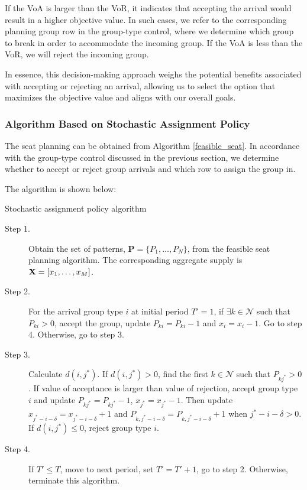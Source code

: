 If the VoA is larger than the VoR, it indicates that accepting the arrival would result in a higher objective value. In such cases, we refer to the corresponding planning group row in the group-type control, where we determine which group to break in order to accommodate the incoming group. If the VoA is less than the VoR, we will reject the incoming group.

In essence, this decision-making approach weighs the potential benefits associated with accepting or rejecting an arrival, allowing us to select the option that maximizes the objective value and aligns with our overall goals.


\subsubsection{Algorithm Based on Stochastic Assignment Policy}
The seat planning can be obtained from Algorithm \ref{feasible_seat}. In accordance with the group-type control discussed in the previous section, we determine whether to accept or reject group arrivals and which row to assign the group in.

The algorithm is shown below:

\begin{algorithm}[H]
  \caption{Stochastic assignment policy algorithm}\label{algo_dynamic_policy}
  \begin{description}
    \item[Step 1.] Obtain the set of patterns, $\mathbf{P} = \{P_1,\ldots,P_{N}\}$, from the feasible seat planning algorithm. The corresponding aggregate supply is $\mathbf{X} = [x_{1}, \ldots, x_{M}]$.
    \item[Step 2.] For the arrival group type $i$ at initial period $T{'} =1$, if $\exists k \in \mathcal{N}$ such that $P_{ki} > 0$, accept the group, update $P_{ki} = P_{ki} -1$ and $x_{i} = x_{i} -1$. Go to step 4. Otherwise, go to step 3.
    \item[Step 3.] Calculate $d(i,j^{*})$. If $d(i,j^{*})>0$, find the first $k \in \mathcal{N}$ such that $P_{k j^{*}} >0$. If value of acceptance is larger than value of rejection, accept group type $i$ and update $P_{k j^{*}} = P_{k j^{*}}-1$, $x_{j^{*}} = x_{j^{*}} -1$. Then update $x_{j^{*}-i-\delta} = x_{j^{*}-i-\delta} + 1$ and $P_{k, j^{*}-i-\delta} = P_{k, j^{*}-i-\delta} +1$ when $j^{*}-i-\delta > 0$. If $d(i,j^{*}) \leq 0$, reject group type $i$.
    \item[Step 4.] If $T{'} \leq T$, move to next period, set $T{'} = T{'}+1$, go to step 2. Otherwise, terminate this algorithm.
  \end{description}
\end{algorithm}


